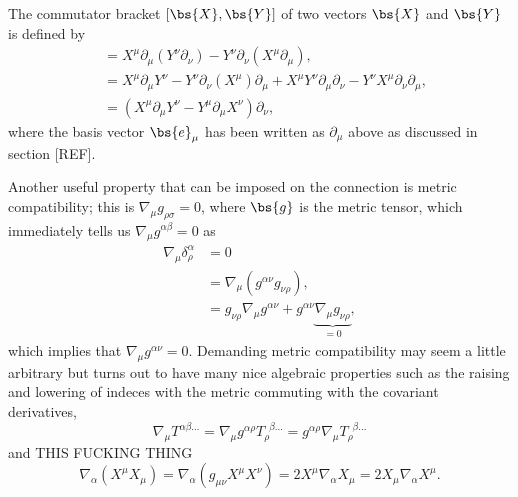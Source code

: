 The commutator bracket $[\bs{X},\bs{Y}]$ of two vectors $\bs{X}$ and $\bs{Y}$ is defined by 
\begin{align}
[X^\mu \partial_\mu,Y^\nu \partial_\nu] &= X^\mu \partial_\mu (Y^\nu \partial_\nu) - Y^\nu \partial_\nu (X^\mu \partial_\mu) ,\\
&= X^\mu \partial_\mu Y^\nu  - Y^\nu \partial_\nu (X^\mu ) \partial_\mu + X^\mu Y^\nu \partial_\mu  \partial_\nu - Y^\nu X^\mu\partial_\nu  \partial_\mu ,\\
&= (X^\mu \partial_\mu Y^\nu  - Y^\mu \partial_\mu X^\nu ) \partial_\nu ,
\end{align}
where the basis vector $\bs{e}_\mu$ has been written as $\partial_\mu$ above as discussed in section [REF].

Another useful property that can be imposed on the connection is metric compatibility; this is $\nabla_\mu g_{\rho\sigma}=0$, where $\bs{g}$ is the metric tensor, which immediately tells us $\nabla_\mu g^{\alpha\beta}=0$ as 
\begin{align}
\nabla_\mu \delta^\alpha_\rho &= 0 \\ 
&=  \nabla_\mu(g^{\alpha \nu}g_{\nu \rho}) ,\\
&= g_{\nu \rho}\nabla_\mu g^{\alpha \nu} + g^{\alpha \nu}\underbrace{\nabla_\mu g_{\nu \rho}}_{=0},
\end{align}
which implies that $\nabla_\mu g^{\alpha\nu}=0$. Demanding metric compatibility may seem a little arbitrary but turns out to have many nice algebraic properties such as the raising and lowering of indeces with the metric commuting with the covariant derivatives,
\begin{equation} \nabla_{\mu} T^{\alpha \beta ...} = \nabla_\mu g^{\alpha\rho}T_{\rho}^{\,\,\,\beta ...} = g^{\alpha\rho} \nabla_\mu T_{\rho}^{\,\,\,\beta ...} \end{equation}
and THIS FUCKING THING
\begin{equation}
\nabla_\alpha (X^\mu X_\mu) = \nabla_\alpha (g_{\mu\nu}X^\mu X^\nu) = 2 X^\mu \nabla_\alpha X_\mu = 2 X_\mu \nabla_\alpha X^\mu.
\end{equation}


